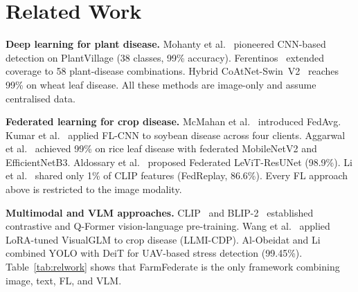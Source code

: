\documentclass[conference]{IEEEtran}
\begin{document}
\section{Related Work}

\textbf{Deep learning for plant disease.}
Mohanty et al.~\cite{Mohanty2016} pioneered CNN-based detection on
PlantVillage (38 classes, 99\% accuracy). Ferentinos~\cite{Ferentinos2018}
extended coverage to 58 plant-disease combinations. Hybrid
CoAtNet-Swin~V2~\cite{FahimUlIslam2024} reaches 99\% on wheat leaf
disease. All these methods are image-only and assume centralised data.

\textbf{Federated learning for crop disease.}
McMahan et al.~\cite{McMahan2017} introduced FedAvg. Kumar et
al.~\cite{Kumar2024} applied FL-CNN to soybean disease across four
clients. Aggarwal et al.~\cite{Aggarwal2023} achieved 99\% on rice leaf
disease with federated MobileNetV2 and EfficientNetB3. Aldossary et
al.~\cite{Aldossary2025} proposed Federated LeViT-ResUNet (98.9\%).
Li et al.~\cite{Li2025} shared only 1\% of CLIP features (FedReplay,
86.6\%). Every FL approach above is restricted to the image modality.

\textbf{Multimodal and VLM approaches.}
CLIP~\cite{Radford2021} and BLIP-2~\cite{Li2023blip} established
contrastive and Q-Former vision-language pre-training. Wang et
al.~\cite{Wang2023} applied LoRA-tuned VisualGLM to crop disease (LLMI-CDP).
Al-Obeidat and Li~\cite{AlObeidat2025} combined YOLO with DeiT for
UAV-based stress detection (99.45\%). Table~\ref{tab:relwork} shows that
FarmFederate is the only framework combining image, text, FL, and VLM.
\end{document}
